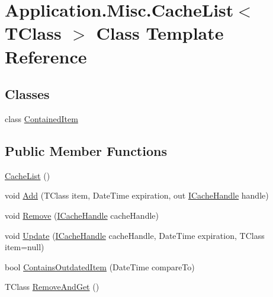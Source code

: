 \hypertarget{class_application_1_1_misc_1_1_cache_list}{}\section{Application.\+Misc.\+Cache\+List$<$ T\+Class $>$ Class Template Reference}
\label{class_application_1_1_misc_1_1_cache_list}
\subsection*{Classes}
\begin{DoxyCompactItemize}
\item 
class \mbox{\hyperlink{class_application_1_1_misc_1_1_cache_list_1_1_contained_item}{Contained\+Item}}
\end{DoxyCompactItemize}
\subsection*{Public Member Functions}
\begin{DoxyCompactItemize}
\item 
\mbox{\hyperlink{class_application_1_1_misc_1_1_cache_list_aa90b33801fe1b0cba3437908aa470f25}{Cache\+List}} ()
\item 
void \mbox{\hyperlink{class_application_1_1_misc_1_1_cache_list_a00141bfa7925e94f1eb396cc00c2d9c1}{Add}} (T\+Class item, Date\+Time expiration, out \mbox{\hyperlink{interface_application_1_1_misc_1_1_i_cache_handle}{I\+Cache\+Handle}} handle)
\item 
void \mbox{\hyperlink{class_application_1_1_misc_1_1_cache_list_aa497244166710a24aa1aed9efc739256}{Remove}} (\mbox{\hyperlink{interface_application_1_1_misc_1_1_i_cache_handle}{I\+Cache\+Handle}} cache\+Handle)
\item 
void \mbox{\hyperlink{class_application_1_1_misc_1_1_cache_list_a7ffcd0d1d2df50cf6e58ad68eaeb670d}{Update}} (\mbox{\hyperlink{interface_application_1_1_misc_1_1_i_cache_handle}{I\+Cache\+Handle}} cache\+Handle, Date\+Time expiration, T\+Class item=null)
\item 
bool \mbox{\hyperlink{class_application_1_1_misc_1_1_cache_list_ab84c82298def7a9d3c11d3c401f43b45}{Contains\+Outdated\+Item}} (Date\+Time compare\+To)
\item 
T\+Class \mbox{\hyperlink{class_application_1_1_misc_1_1_cache_list_af1093c1339d895ab16286b7834d0f1c1}{Remove\+And\+Get}} ()
\end{DoxyCompactItemize}
